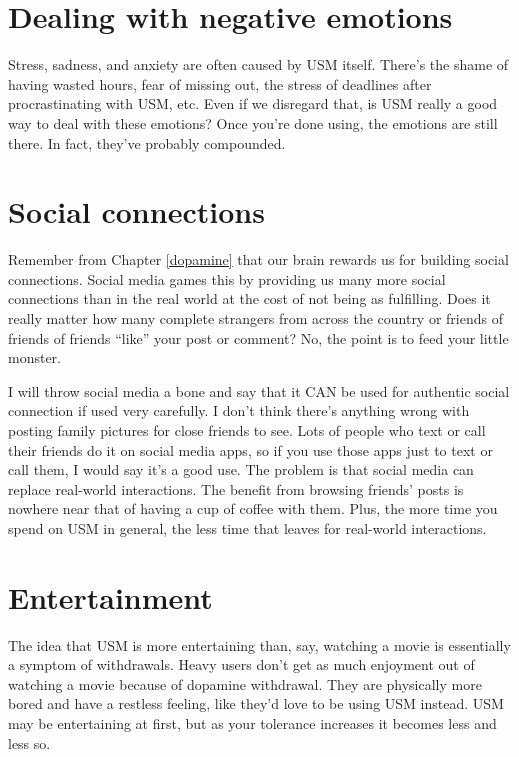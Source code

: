 \documentclass[
]{book}
\begin{document}
\section{Dealing with negative emotions}\label{dealing-with-negative-emotions}

Stress, sadness, and anxiety are often caused by USM itself. There's the shame of having wasted hours, fear of missing out, the stress of deadlines after procrastinating with USM, etc. Even if we disregard that, is USM really a good way to deal with these emotions? Once you're done using, the emotions are still there. In fact, they've probably compounded.

\section{Social connections}\label{social-connections}

Remember from Chapter \ref{dopamine} that our brain rewards us for building social connections. Social media games this by providing us many more social connections than in the real world at the cost of not being as fulfilling. Does it really matter how many complete strangers from across the country or friends of friends of friends ``like'' your post or comment? No, the point is to feed your little monster.

I will throw social media a bone and say that it CAN be used for authentic social connection if used very carefully. I don't think there's anything wrong with posting family pictures for close friends to see. Lots of people who text or call their friends do it on social media apps, so if you use those apps just to text or call them, I would say it's a good use. The problem is that social media can replace real-world interactions. The benefit from browsing friends' posts is nowhere near that of having a cup of coffee with them. Plus, the more time you spend on USM in general, the less time that leaves for real-world interactions.

\section{Entertainment}\label{entertainment}

The idea that USM is more entertaining than, say, watching a movie is essentially a symptom of withdrawals. Heavy users don't get as much enjoyment out of watching a movie because of dopamine withdrawal. They are physically more bored and have a restless feeling, like they'd love to be using USM instead. USM may be entertaining at first, but as your tolerance increases it becomes less and less so.
\end{document}
